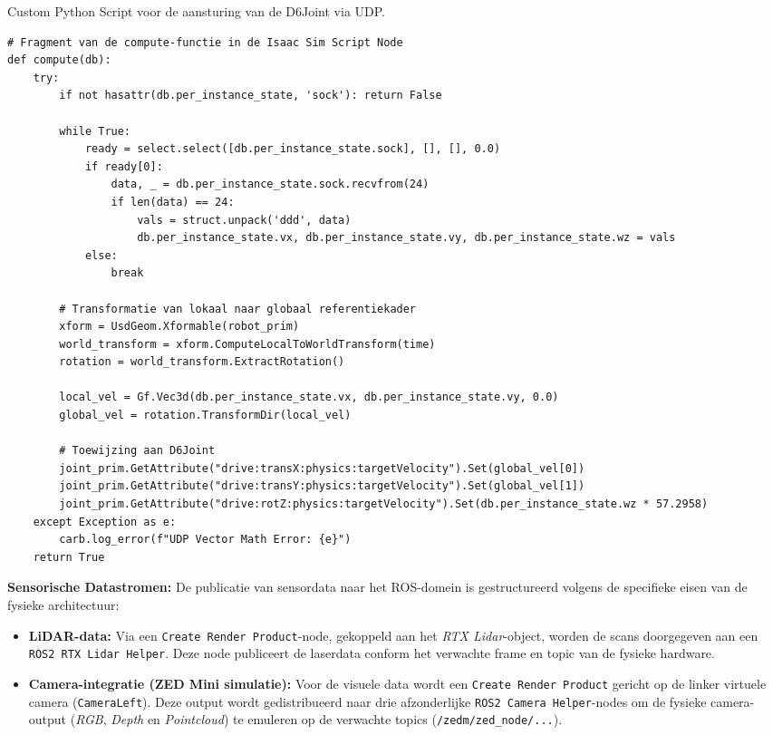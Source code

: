 \begin{listing}[h]
\caption{Custom Python Script voor de aansturing van de D6Joint via UDP.}
\label{lst:udp_script}
\begin{verbatim}
# Fragment van de compute-functie in de Isaac Sim Script Node
def compute(db):
    try:
        if not hasattr(db.per_instance_state, 'sock'): return False
        
        while True:
            ready = select.select([db.per_instance_state.sock], [], [], 0.0)
            if ready[0]:
                data, _ = db.per_instance_state.sock.recvfrom(24)
                if len(data) == 24:
                    vals = struct.unpack('ddd', data)
                    db.per_instance_state.vx, db.per_instance_state.vy, db.per_instance_state.wz = vals
            else:
                break
                
        # Transformatie van lokaal naar globaal referentiekader
        xform = UsdGeom.Xformable(robot_prim)
        world_transform = xform.ComputeLocalToWorldTransform(time)
        rotation = world_transform.ExtractRotation()
        
        local_vel = Gf.Vec3d(db.per_instance_state.vx, db.per_instance_state.vy, 0.0)
        global_vel = rotation.TransformDir(local_vel)
        
        # Toewijzing aan D6Joint
        joint_prim.GetAttribute("drive:transX:physics:targetVelocity").Set(global_vel[0])
        joint_prim.GetAttribute("drive:transY:physics:targetVelocity").Set(global_vel[1])
        joint_prim.GetAttribute("drive:rotZ:physics:targetVelocity").Set(db.per_instance_state.wz * 57.2958)
    except Exception as e:
        carb.log_error(f"UDP Vector Math Error: {e}")
    return True
\end{verbatim}
\end{listing}

\textbf{Sensorische Datastromen:}
De publicatie van sensordata naar het ROS-domein is gestructureerd volgens de specifieke eisen van de fysieke architectuur:

\begin{itemize}
    \item \textbf{LiDAR-data:} Via een \texttt{Create Render Product}-node, gekoppeld aan het \textit{RTX Lidar}-object, worden de scans doorgegeven aan een \texttt{ROS2 RTX Lidar Helper}. Deze node publiceert de laserdata conform het verwachte frame en topic van de fysieke hardware.
    \item \textbf{Camera-integratie (ZED Mini simulatie):} Voor de visuele data wordt een \texttt{Create Render Product} gericht op de linker virtuele camera (\texttt{CameraLeft}). Deze output wordt gedistribueerd naar drie afzonderlijke \texttt{ROS2 Camera Helper}-nodes om de fysieke camera-output (\textit{RGB}, \textit{Depth} en \textit{Pointcloud}) te emuleren op de verwachte topics (\texttt{/zedm/zed\_node/...}).
\end{itemize}

